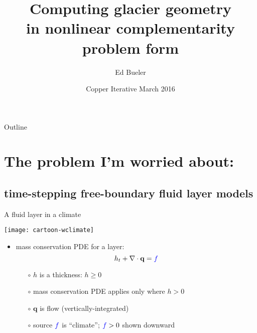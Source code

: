 \documentclass{beamer}
\title[Computing glacier geometry]{Computing glacier geometry \\ in nonlinear complementarity problem form}
\author{Ed Bueler}
\institute[UAF] %
{
  Dept of Mathematics and Statistics, and Geophysical Institute\\
  University of Alaska Fairbanks \\
  \tiny (\emph{funded by NASA Modeling, Analysis, and Prediction program})%
}
\date{Copper Iterative March 2016}
\newcommand\bq{\mathbf{q}}
\newcommand{\Div}{\nabla\cdot}
\begin{document}
\graphicspath{{../../layer-conserve/images/}{../../talks-public/commonfigs/}}

\begin{frame}
  \titlepage
\end{frame}

\begin{frame}{Outline}
  \tableofcontents
\end{frame}


\section{The problem I'm worried about:}

\subsection{time-stepping free-boundary fluid layer models}

\begin{frame}{A fluid layer in a climate}

\begin{center}
\texttt{[image: cartoon-wclimate]}
\end{center}

\vspace{-7mm}
  \begin{itemize}
  \item mass conservation PDE for a layer:
      $$h_t + \Div\bq = {\color{blue} f}$$
    \begin{itemize}
    \vspace{-4mm}
    \item[$\circ$] $h$ is a thickness: $h\ge 0$
    \item[$\circ$] mass conservation PDE applies only where $h>0$
    \item[$\circ$] $\bq$ is flow (vertically-integrated)
    \item[$\circ$] source ${\color{blue} f}$ is ``climate''; ${\color{blue} f}>0$ shown downward
    \end{itemize}
  \end{itemize}
\end{frame}
\end{document}
